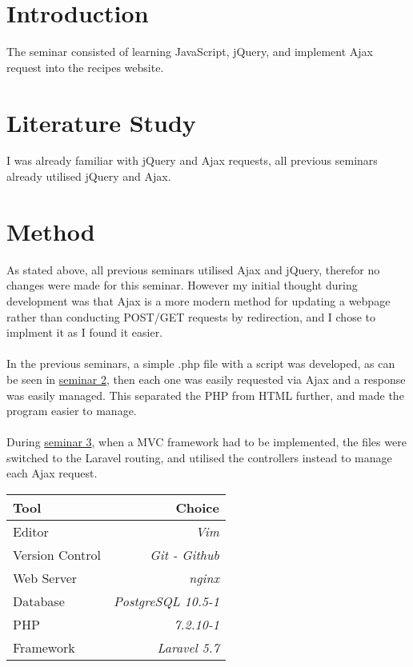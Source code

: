 \documentclass[a4paper]{scrartcl}
\title{}
\subtitle{Internet Applications, ID1354}
\author{Linus Berg Linus@Fenix.me.uk}
\date{\today}
\begin{document}
\maketitle

\section{Introduction}

The seminar consisted of learning JavaScript, jQuery, and implement Ajax request
into the recipes website.
\section{Literature Study}
I was already familiar with jQuery and Ajax requests, all previous seminars
already utilised jQuery and Ajax.

\section{Method}
As stated above, all previous seminars utilised Ajax and jQuery, therefor no
changes were made for this seminar. However my initial thought during development
was that Ajax is a more modern method for updating a webpage rather than conducting
POST/GET requests by redirection, and I chose to implment it as I found it easier.
\\\\
\noindent
In the previous seminars, a simple .php file with a script was developed,
as can be seen in \href{https://github.com/linus-dev/KTH-Projects/tree/master/ID1354/2}{seminar 2},
then each one was easily requested via Ajax and a response was easily managed.
This separated the PHP from HTML further, and made the program easier to manage.
\\\\
\noindent
During \href{https://github.com/linus-dev/KTH-Projects/tree/master/ID1354/3}{seminar 3}, when
a MVC framework had to be implemented, the files were switched to the Laravel routing, and utilised
the controllers instead to manage each Ajax request.

\begin{center}
    \begin{tabular}{  l | r }
    Tool & Choice \\ 
    \hline
    Editor & \textit{Vim}\\
    Version Control & \textit{Git - Github}\\
    Web Server & \textit{nginx}\\
    Database & \textit{PostgreSQL 10.5-1}\\
    PHP & \textit{7.2.10-1} \\
    Framework & \textit{Laravel 5.7}\\
    \end{tabular}
\end{center}
\end{document}
